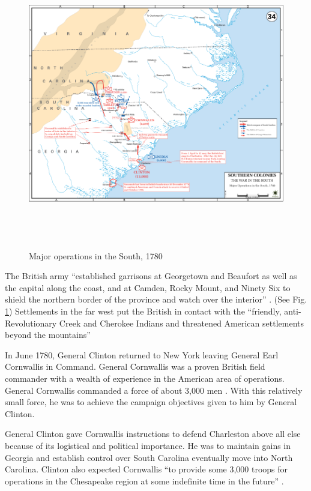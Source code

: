 \begin{figure}[h]
\begin{center}
\includegraphics[height=5in]{gfx/Nicholson3}
\end{center}
\caption{Major operations in the South, 1780 \cite[Map 34]{web:USMA:map34}}
\label{Nicholson3}
\end{figure}

The British army “established garrisons at Georgetown and Beaufort as well as
the capital along the coast, and at Camden, Rocky Mount, and Ninety Six to
shield the northern border of the province and watch over the interior”
\cite[p.10]{weigley_partisan_1970}.  (See Fig. \ref{Nicholson3}) Settlements in
the far west put the British in contact with the “friendly, anti-Revolutionary
Creek and Cherokee Indians and threatened American settlements beyond the
mountains” \cite[p.10]{weigley_partisan_1970} 

In June 1780, General Clinton returned to New York leaving General Earl
Cornwallis in Command.  General Cornwallis was a proven British field commander
with a wealth of experience in the American area of operations.  General
Cornwallis commanded a force of about 3,000 men
\cite[p.51]{woodward_comparative_2002}.  With this
relatively small force, he was to achieve the campaign objectives given to him
by General Clinton.  

General Clinton gave Cornwallis instructions to defend Charleston above all else
because of its logistical and political importance.  He was to maintain gains in
Georgia and establish control over South Carolina eventually move into North
Carolina.  Clinton also expected Cornwallis “to provide some 3,000 troops for
operations in the Chesapeake region at some indefinite time in the future”
\cite[p.51]{woodward_comparative_2002}.  

